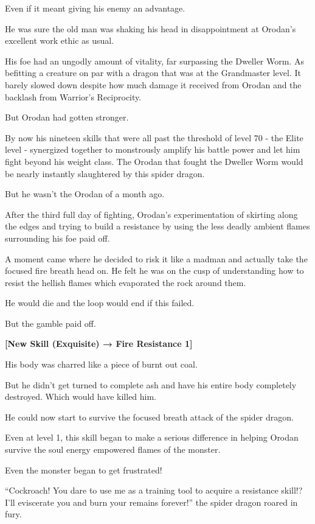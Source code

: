 \documentclass[a4paper,10pt]{book}
\begin{document}
Even if it meant giving his enemy an advantage.\par
He was sure the old man was shaking his head in disappointment at Orodan’s excellent work ethic as usual.\par
His foe had an ungodly amount of vitality, far surpassing the Dweller Worm. As befitting a creature on par with a dragon that was at the Grandmaster level. It barely slowed down despite how much damage it received from Orodan and the backlash from Warrior’s Reciprocity.\par
But Orodan had gotten stronger.\par
By now his nineteen skills that were all past the threshold of level 70 - the Elite level - synergized together to monstrously amplify his battle power and let him fight beyond his weight class. The Orodan that fought the Dweller Worm would be nearly instantly slaughtered by this spider dragon.\par
But he wasn’t the Orodan of a month ago.\par
After the third full day of fighting, Orodan’s experimentation of skirting along the edges and trying to build a resistance by using the less deadly ambient flames surrounding his foe paid off.\par
A moment came where he decided to risk it like a madman and actually take the focused fire breath head on. He felt he was on the cusp of understanding how to resist the hellish flames which evaporated the rock around them.\par
He would die and the loop would end if this failed.\par
But the gamble paid off.\par
\textbf{[New Skill (Exquisite) → Fire Resistance 1]}\par
His body was charred like a piece of burnt out coal.\par
But he didn’t get turned to complete ash and have his entire body completely destroyed. Which would have killed him.\par
He could now start to survive the focused breath attack of the spider dragon.\par
Even at level 1, this skill began to make a serious difference in helping Orodan survive the soul energy empowered flames of the monster.\par
Even the monster began to get frustrated!\par
“Cockroach! You dare to use me as a training tool to acquire a resistance skill!? I’ll eviscerate you and burn your remains forever!” the spider dragon roared in fury.\par
\end{document}
